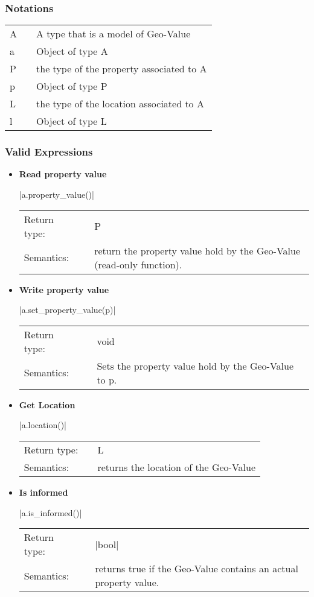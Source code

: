 \documentclass[12pt,twoside]{report}
\begin{document}
\htmlrule[CLEAR=all]  \subsubsection*{Notations}

\begin{tabular}[!h]{l l l}
A & & A type that is a model of Geo-Value\\
a & & Object of type A\\
P & &  the type of the property associated to A\\
p & & Object of type P\\
L & & the type of the location associated to A\\
l & & Object of type L
\end{tabular}


\htmlrule[CLEAR=all]  \subsubsection*{Valid Expressions}
\begin{itemize}
\item {\bf Read property value}

  |a.property_value()|

  \begin{tabular}[!h]{l p{1cm} p{10cm}}
    Return type: & & P\\
    Semantics: & & return the property value hold by the Geo-Value (read-only function).
  \end{tabular}


\item {\bf Write property value}

  |a.set_property_value(p)|

  \begin{tabular}[!h]{l p{1cm} p{10cm}}
    Return type: & & void\\
    Semantics: & & Sets the property value hold by the Geo-Value to p.
  \end{tabular}


\item {\bf Get Location}

  |a.location()|

  \begin{tabular}[!h]{l p{1cm} p{10cm}}
    Return type: & & L\\
    Semantics: & & returns the location of the Geo-Value
  \end{tabular}


\item {\bf Is informed}

  |a.is_informed()|

  \begin{tabular}[!h]{l p{1cm} p{10cm}}
    Return type: & & |bool|\\
    Semantics: & & returns true if the Geo-Value contains an actual property value.
  \end{tabular}

\end{itemize}
 
\end{document}
